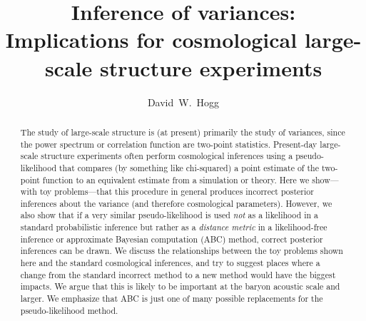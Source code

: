 \documentclass[12pt, letterpaper, preprint]{aastex}
\begin{document}
\sloppy\sloppypar\frenchspacing %

\title{Inference of variances:\\
       Implications for cosmological large-scale structure experiments}
\author{
  David~W.~Hogg
}

\begin{abstract}
The study of large-scale structure is (at present) primarily the study
of variances, since the power spectrum or correlation function are
two-point statistics.
Present-day large-scale structure experiments often perform
cosmological inferences using a pseudo-likelihood that compares
(by something like chi-squared) a
point estimate of the two-point function to an equivalent estimate
from a simulation or theory.
Here we show---with toy problems---that this procedure in general
produces incorrect posterior inferences about the variance (and
therefore cosmological parameters).
However, we also show that if a very similar pseudo-likelihood
is used
\emph{not} as a likelihood in a standard probabilistic inference but
rather as a \emph{distance metric} in a likelihood-free inference or
approximate Bayesian
computation (ABC) method, correct posterior inferences can be drawn.
We discuss the relationships between the toy problems shown here and
the standard cosmological inferences, and try to suggest places where
a change from the standard incorrect method to a new method would
have the biggest impacts.
We argue that this is likely to be important at the baryon acoustic
scale and larger.
We emphasize that ABC is just one of many possible replacements for
the pseudo-likelihood method.
\end{abstract}

\end{document}
